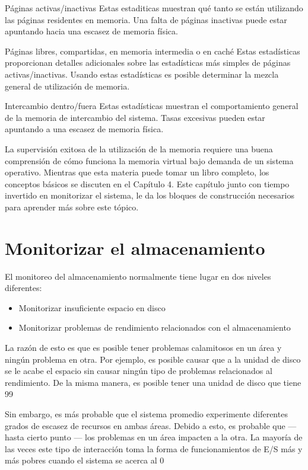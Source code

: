 \documentclass[12pt]{article}
\begin{document}
Páginas activas/inactivas
Estas estaditicas muestran qué tanto se están utilizando las páginas residentes en memoria. Una falta de páginas inactivas puede estar apuntando hacia una escasez de memoria física.

Páginas libres, compartidas, en memoria intermedia o en caché
Estas estadísticas proporcionan detalles adicionales sobre las estadísticas más simples de páginas activas/inactivas. Usando estas estadísticas es posible determinar la mezcla general de utilización de memoria.

Intercambio dentro/fuera
Estas estadísticas muestran el comportamiento general de la memoria de intercambio del sistema. Tasas excesivas pueden estar apuntando a una escasez de memoria física.

La supervisión exitosa de la utilización de la memoria requiere una buena comprensión de cómo funciona la memoria virtual bajo demanda de un sistema operativo. Mientras que esta materia puede tomar un libro completo, los conceptos básicos se discuten en el Capítulo 4. Este capítulo junto con tiempo invertido en monitorizar el sistema, le da los bloques de construcción necesarios para aprender más sobre este tópico.

\section*{Monitorizar el almacenamiento}
El monitoreo del almacenamiento normalmente tiene lugar en dos niveles diferentes:

\begin{itemize}
\item Monitorizar insuficiente espacio en disco

\item Monitorizar problemas de rendimiento relacionados con el almacenamiento
\end{itemize}

La razón de esto es que es posible tener problemas calamitosos en un área y ningún problema en otra. Por ejemplo, es posible causar que a la unidad de disco se le acabe el espacio sin causar ningún tipo de problemas relacionados al rendimiento. De la misma manera, es posible tener una unidad de disco que tiene 99%

Sin embargo, es más probable que el sistema promedio experimente diferentes grados de escasez de recursos en ambas áreas. Debido a esto, es probable que — hasta cierto punto — los problemas en un área impacten a la otra. La mayoría de las veces este tipo de interacción toma la forma de funcionamientos de E/S más y más pobres cuando el sistema se acerca al 0%
\end{document}

